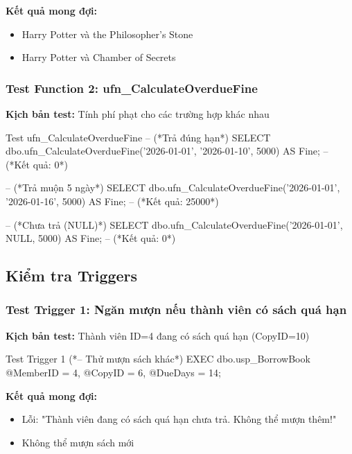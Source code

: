 \documentclass[12pt,a4paper]{article}
\begin{document}
\textbf{Kết quả mong đợi:}
\begin{itemize}
    \item Harry Potter và the Philosopher's Stone
    \item Harry Potter và Chamber of Secrets
\end{itemize}

\subsubsection{Test Function 2: ufn\_CalculateOverdueFine}

\textbf{Kịch bản test:} Tính phí phạt cho các trường hợp khác nhau

\begin{sqlcode}{Test ufn_CalculateOverdueFine}
-- (*Trả đúng hạn*)
SELECT dbo.ufn_CalculateOverdueFine('2026-01-01', '2026-01-10', 5000) AS Fine;
-- (*Kết quả: 0*)

-- (*Trả muộn 5 ngày*)
SELECT dbo.ufn_CalculateOverdueFine('2026-01-01', '2026-01-16', 5000) AS Fine;
-- (*Kết quả: 25000*)

-- (*Chưa trả (NULL)*)
SELECT dbo.ufn_CalculateOverdueFine('2026-01-01', NULL, 5000) AS Fine;
-- (*Kết quả: 0*)
\end{sqlcode}

\subsection{Kiểm tra Triggers}

\subsubsection{Test Trigger 1: Ngăn mượn nếu thành viên có sách quá hạn}

\textbf{Kịch bản test:} Thành viên ID=4 đang có sách quá hạn (CopyID=10)

\begin{sqlcode}{Test Trigger 1}
(*-- Thử mượn sách khác*)
EXEC dbo.usp_BorrowBook
    @MemberID = 4,
    @CopyID = 6,
    @DueDays = 14;
\end{sqlcode}

\textbf{Kết quả mong đợi:}
\begin{itemize}
    \item Lỗi: "Thành viên đang có sách quá hạn chưa trả. Không thể mượn thêm!"
    \item Không thể mượn sách mới
\end{itemize}
\end{document}
